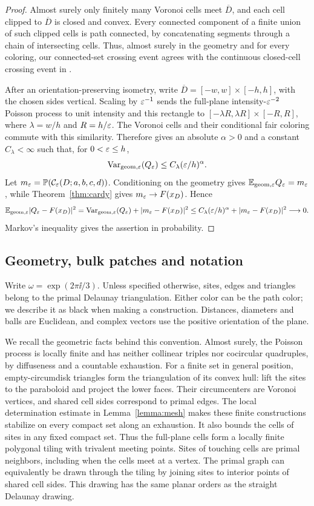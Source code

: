 \begin{proof}
Almost surely only finitely many Voronoi cells meet $\overline D$, and
each cell clipped to $\overline D$ is closed and convex. Every connected
component of a finite union of such clipped cells is path connected, by
concatenating segments through a chain of intersecting cells. Thus, almost
surely in the geometry and for every coloring, our connected-set crossing
event agrees with the continuous closed-cell crossing event in
\cite[Definition~1.1]{Vanneuville2025}.

After an orientation-preserving isometry, write
$\overline D=[-w,w]\times[-h,h]$, with the chosen sides vertical.
Scaling by $\varepsilon^{-1}$ sends the full-plane intensity-$\varepsilon^{-2}$ Poisson
process to unit intensity and this rectangle to
$[-\lambda R,\lambda R]\times[-R,R]$, where $\lambda=w/h$ and
$R=h/\varepsilon$. The Voronoi cells and their conditional fair coloring
commute with this similarity. Therefore
\cite[Theorem~1.3]{Vanneuville2025} gives an absolute $\alpha>0$ and a
constant $C_\lambda<\infty$ such that, for $0<\varepsilon\le h$,
\[
 \operatorname{Var}_{\mathrm{geom},\varepsilon}(Q_\varepsilon)
 \le C_\lambda(\varepsilon/h)^\alpha.
\]
Let $m_\varepsilon=\mathbb P(\mathcal C_\varepsilon(D;a,b,c,d))$. Conditioning on the
geometry gives $\mathbb E_{\mathrm{geom},\varepsilon}Q_\varepsilon=m_\varepsilon$, while
Theorem~\ref{thm:cardy} gives $m_\varepsilon\to F(x_D)$. Hence
\[
 \mathbb E_{\mathrm{geom},\varepsilon}|Q_\varepsilon-F(x_D)|^2
 =\operatorname{Var}_{\mathrm{geom},\varepsilon}(Q_\varepsilon)+|m_\varepsilon-F(x_D)|^2
 \le C_\lambda(\varepsilon/h)^\alpha+|m_\varepsilon-F(x_D)|^2
 \longrightarrow0.
\]
Markov's inequality gives the assertion in probability.
\end{proof}

\subsection{Geometry, bulk patches and notation}

Write $\omega=\exp(2\pi\ii/3)$. Unless specified otherwise, sites, edges
and triangles belong to the primal Delaunay triangulation. Either
color can be the path color; we describe it as black when making a
construction. Distances, diameters and balls are Euclidean, and complex
vectors use the positive orientation of the plane.

We recall the geometric facts behind this convention. Almost surely,
the Poisson process is locally finite and has neither collinear triples
nor cocircular quadruples, by diffuseness and a countable exhaustion.
For a finite set in general position, empty-circumdisk triangles form
the triangulation of its convex hull: lift the sites to the paraboloid
and project the lower faces. Their circumcenters are Voronoi vertices,
and shared cell sides correspond to primal edges. The local
determination estimate in Lemma~\ref{lemma:mesh} makes these finite
constructions stabilize on every compact set along an exhaustion.
It also bounds the cells of sites in any fixed compact set. Thus the
full-plane cells form a locally finite polygonal tiling with trivalent
meeting points. Sites of touching cells are primal neighbors, including
when the cells meet at a vertex. The primal graph can equivalently be
drawn through the tiling by joining sites to interior points of shared
cell sides. This drawing has the same planar orders as the straight
Delaunay drawing.


